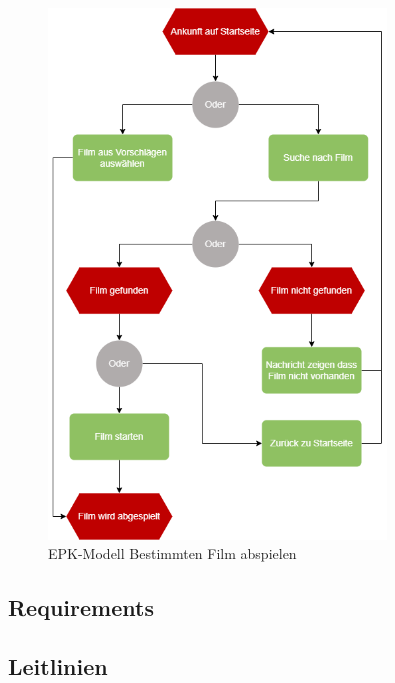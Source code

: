 \begin{appendix}
    \begin{figure}[H]
        \centering
        \includegraphics[width=0.8\textwidth]{images/ReQ_MovieSearch_EPK}
        \caption{EPK-Modell Bestimmten Film abspielen}
        \label{fig:epk_search}
    \end{figure}

    \subsection{Requirements}\label{subsec:requirements_catalouge}
    

    \subsection{Leitlinien}\label{subsec:leitlinien}
    
\end{appendix}